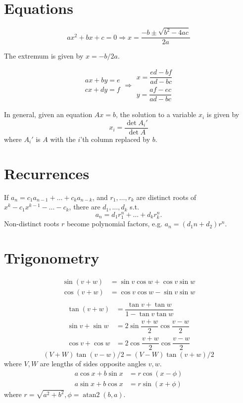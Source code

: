 \section{Equations}
\[ax^2+bx+c=0 \Rightarrow x = \frac{-b\pm\sqrt{b^2-4ac}}{2a}\]

The extremum is given by $x = -b/2a$.

\[\begin{aligned}ax+by=e\\cx+dy=f\end{aligned}
\Rightarrow
\begin{aligned}x=\dfrac{ed-bf}{ad-bc}\\y=\dfrac{af-ec}{ad-bc}\end{aligned}\]

In general, given an equation $Ax = b$, the solution to a variable $x_i$ is given by
\[x_i = \frac{\det A_i'}{\det A} \]
where $A_i'$ is $A$ with the $i$'th column replaced by $b$.

\section{Recurrences}
If $a_n = c_1 a_{n-1} + \dots + c_k a_{n-k}$, and $r_1, \dots, r_k$ are distinct roots of $x^k - c_1 x^{k-1} - \dots - c_k$, there are $d_1, \dots, d_k$ s.t.
\[a_n = d_1r_1^n + \dots + d_kr_k^n. \]
Non-distinct roots $r$ become polynomial factors, e.g. $a_n = (d_1n + d_2)r^n$.

\section{Trigonometry}
\begin{align*}
\sin(v+w)&{}=\sin v\cos w+\cos v\sin w\\
\cos(v+w)&{}=\cos v\cos w-\sin v\sin w\\
\end{align*}
\begin{align*}
\tan(v+w)&{}=\dfrac{\tan v+\tan w}{1-\tan v\tan w}\\
\sin v+\sin w&{}=2\sin\dfrac{v+w}{2}\cos\dfrac{v-w}{2}\\
\cos v+\cos w&{}=2\cos\dfrac{v+w}{2}\cos\dfrac{v-w}{2}
\end{align*}
\[ (V+W)\tan(v-w)/2{}=(V-W)\tan(v+w)/2 \]
where $V, W$ are lengths of sides opposite angles $v, w$.
\begin{align*}
	a\cos x+b\sin x&=r\cos(x-\phi)\\
	a\sin x+b\cos x&=r\sin(x+\phi)
\end{align*}
where $r=\sqrt{a^2+b^2}, \phi=\operatorname{atan2}(b,a)$.

